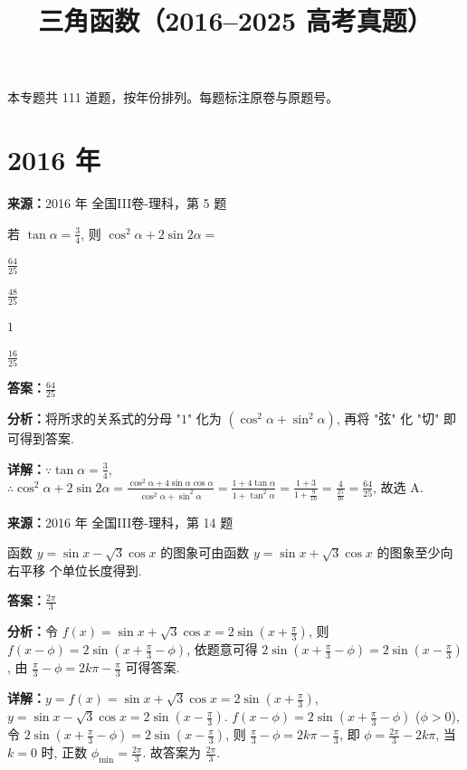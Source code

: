 ﻿\title{三角函数（2016--2025 高考真题）}
\author{}
\date{}
\maketitle
\noindent 本专题共 111 道题，按年份排列。每题标注原卷与原题号。

\section*{2016 年}

\begin{question}[points=5]
\textbf{来源：}2016 年 全国III卷-理科，第 5 题\par
若 $\tan\alpha=\frac{3}{4}$, 则 $\cos^2\alpha+2\sin2\alpha=$
\begin{choices}
  \item $\frac{64}{25}$
  \item $\frac{48}{25}$
  \item $1$
  \item $\frac{16}{25}$
\end{choices}
\begin{solution}
\textbf{答案：}$\frac{64}{25}$

\textbf{分析：}将所求的关系式的分母 "$1$" 化为 $(\cos^2\alpha+\sin^2\alpha)$, 再将 "弦" 化 "切" 即可得到答案.

\textbf{详解：}$\because\tan\alpha=\frac{3}{4}$, $\therefore\cos^2\alpha+2\sin2\alpha=\frac{\cos^2\alpha+4\sin\alpha\cos\alpha}{\cos^2\alpha+\sin^2\alpha}=\frac{1+4\tan\alpha}{1+\tan^2\alpha}=\frac{1+3}{1+\frac{9}{16}}=\frac{4}{\frac{25}{16}}=\frac{64}{25}$, 故选 A.
\end{solution}
\end{question}

\begin{question}[points=5]
\textbf{来源：}2016 年 全国III卷-理科，第 14 题\par
函数 $y=\sin x-\sqrt{3}\cos x$ 的图象可由函数 $y=\sin x+\sqrt{3}\cos x$ 的图象至少向右平移  个单位长度得到.
\fillin[{$\frac{2\pi}{3}$}]
\begin{solution}
\textbf{答案：}$\frac{2\pi}{3}$

\textbf{分析：}令 $f(x)=\sin x+\sqrt{3}\cos x=2\sin(x+\frac{\pi}{3})$, 则 $f(x-\phi)=2\sin(x+\frac{\pi}{3}-\phi)$, 依题意可得 $2\sin(x+\frac{\pi}{3}-\phi)=2\sin(x-\frac{\pi}{3})$, 由 $\frac{\pi}{3}-\phi=2k\pi-\frac{\pi}{3}$ 可得答案.

\textbf{详解：}$y=f(x)=\sin x+\sqrt{3}\cos x=2\sin(x+\frac{\pi}{3})$, $y=\sin x-\sqrt{3}\cos x=2\sin(x-\frac{\pi}{3})$. $f(x-\phi)=2\sin(x+\frac{\pi}{3}-\phi)$ ($\phi>0$), 令 $2\sin(x+\frac{\pi}{3}-\phi)=2\sin(x-\frac{\pi}{3})$, 则 $\frac{\pi}{3}-\phi=2k\pi-\frac{\pi}{3}$, 即 $\phi=\frac{2\pi}{3}-2k\pi$, 当 $k=0$ 时, 正数 $\phi_{\min}=\frac{2\pi}{3}$. 故答案为 $\frac{2\pi}{3}$.
\end{solution}
\end{question}

